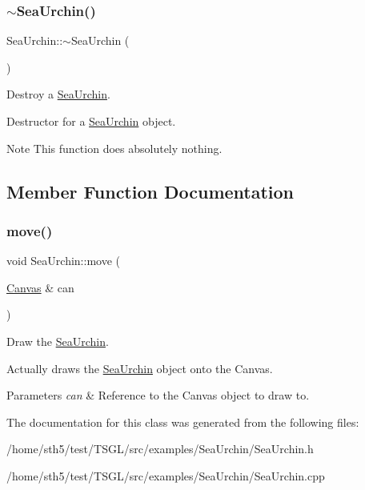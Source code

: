\subsubsection{\texorpdfstring{$\sim$\+Sea\+Urchin()}{~SeaUrchin()}}
{\footnotesize\ttfamily Sea\+Urchin\+::$\sim$\+Sea\+Urchin (\begin{DoxyParamCaption}{ }\end{DoxyParamCaption})\hspace{0.3cm}{\ttfamily [virtual]}}



Destroy a \hyperlink{class_sea_urchin}{Sea\+Urchin}. 

Destructor for a \hyperlink{class_sea_urchin}{Sea\+Urchin} object. \begin{DoxyNote}{Note}
This function does absolutely nothing. 
\end{DoxyNote}


\subsection{Member Function Documentation}
\mbox{\label{class_sea_urchin_aa0e038a0faecaead5928edc082dbc685}} 
\subsubsection{\texorpdfstring{move()}{move()}}
{\footnotesize\ttfamily void Sea\+Urchin\+::move (\begin{DoxyParamCaption}\item[{\hyperlink{classtsgl_1_1_canvas}{Canvas} \&}]{can }\end{DoxyParamCaption})}



Draw the \hyperlink{class_sea_urchin}{Sea\+Urchin}. 

Actually draws the \hyperlink{class_sea_urchin}{Sea\+Urchin} object onto the Canvas. 
\begin{DoxyParams}{Parameters}
{\em can} & Reference to the Canvas object to draw to. \\
\hline
\end{DoxyParams}


The documentation for this class was generated from the following files\+:\begin{DoxyCompactItemize}
\item 
/home/sth5/test/\+T\+S\+G\+L/src/examples/\+Sea\+Urchin/Sea\+Urchin.\+h\item 
/home/sth5/test/\+T\+S\+G\+L/src/examples/\+Sea\+Urchin/Sea\+Urchin.\+cpp\end{DoxyCompactItemize}
